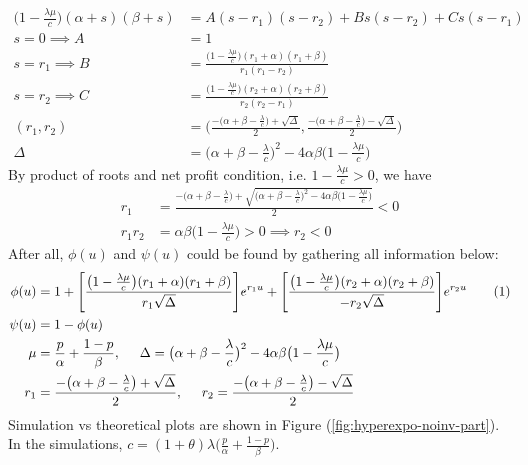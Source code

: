 \documentclass[12pt]{article}
\newcommand\numberthis{\addtocounter{equation}{1}\tag{\theequation}}
\begin{document}
\begin{align*}
    \big(1-\frac{\lambda\mu}{c}\big)(\alpha+s)(\beta+s)&=A(s-r_1)(s-r_2)+Bs(s-r_2)+Cs(s-r_1)\\
    s=0 \implies A&=1\\
    s=r_1 \implies B&=\frac{\big(1-\frac{\lambda\mu}{c}\big)(r_1+\alpha)(r_1+\beta)}{r_1(r_1-r_2)}\\
    s=r_2 \implies C&=\frac{\big(1-\frac{\lambda\mu}{c}\big)(r_2+\alpha)(r_2+\beta)}{r_2(r_2-r_1)}\\
    (r_1,r_2)&=\bigg(\frac{-\big(\alpha+\beta-\frac{\lambda}{c}\big)+\sqrt{\Delta}}{2},\frac{-\big(\alpha+\beta-\frac{\lambda}{c}\big)-\sqrt{\Delta}}{2}\bigg)\\
    \Delta &= \big(\alpha+\beta-\frac{\lambda}{c}\big)^2-4\alpha\beta\big(1-\frac{\lambda\mu}{c}\big)
\end{align*}
By product of roots and net profit condition, i.e.  \(1-\frac{\lambda\mu}{c}>0\), we have
\begin{align*}
    r_1&=\frac{-\big(\alpha+\beta-\frac{\lambda}{c}\big)+\sqrt{\big(\alpha+\beta-\frac{\lambda}{c}\big)^2-4\alpha\beta\big(1-\frac{\lambda\mu}{c}\big)}}{2}<0\\
    r_1 r_2&=\alpha\beta\big(1-\frac{\lambda\mu}{c}\big)>0 \implies r_2<0
\end{align*}
After all, \(\phi(u)\) and \(\psi(u)\) could be found by gathering all information below:
\begin{align*}
    \phi(u)&=1+\Bigg[\frac{\big(1-\frac{\lambda\mu}{c}\big)(r_1+\alpha)(r_1+\beta)}{r_1\sqrt{\Delta}}\Bigg]e^{r_1u}+\Bigg[\frac{\big(1-\frac{\lambda\mu}{c}\big)(r_2+\alpha)(r_2+\beta)}{-r_2\sqrt{\Delta}}\Bigg]e^{r_2u}\numberthis\label{hyperexp_surv}\\
    \psi(u)&=1-\phi(u)\\
    \mu&=\frac{p}{\alpha}+\frac{1-p}{\beta},
    \hspace{0.5cm}
    \Delta = \big(\alpha+\beta-\frac{\lambda}{c}\big)^2-4\alpha\beta\big(1-\frac{\lambda\mu}{c}\big)\\
    r_1&=\frac{-\big(\alpha+\beta-\frac{\lambda}{c}\big)+\sqrt{\Delta}}{2},
    \hspace{0.5cm}
    r_2=\frac{-\big(\alpha+\beta-\frac{\lambda}{c}\big)-\sqrt{\Delta}}{2}
\end{align*}
Simulation vs theoretical plots are shown in Figure (\ref{fig:hyperexpo-noinv-part}). In the simulations, \(c=(1+\theta)\lambda\big(\frac{p}{\alpha}+\frac{1-p}{\beta}\big)\).
\end{document}

